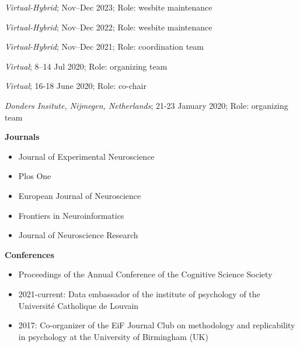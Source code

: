 
\textit{Virtual-Hybrid};
Nov--Dec 2023;
Role: wesbite maintenance

\textit{Virtual-Hybrid};
Nov--Dec 2022;
Role: wesbite maintenance

\textit{Virtual-Hybrid};
Nov--Dec 2021;
Role: coordination team

%
\textit{Virtual};
8--14 Jul 2020;
Role: organizing team

%
\textit{Virtual};
16-18 June 2020;
Role: co-chair

%
\textit{Donders Insitute, Nijmegen, Netherlands};
21-23 January 2020;
Role: organizing team



\textbf{Journals}

\begin{itemize}
    \item Journal of Experimental Neuroscience
    \item Plos One
    \item European Journal of Neuroscience
    \item Frontiers in Neuroinformatics
    \item Journal of Neuroscience Research
\end{itemize}

\textbf{Conferences}

\begin{itemize}
    \item Proceedings of the Annual Conference of the Cognitive Science Society
\end{itemize}



\begin{itemize}
    \item 2021-current: Data embassador of the institute of psychology of the Université Catholique de Louvain
    \item 2017: Co-organizer of the EiF Journal Club on methodology and replicability in psychology at the University of Birmingham (UK)
\end{itemize}

